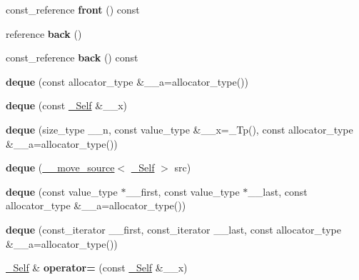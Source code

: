 \begin{DoxyCompactItemize}
const\+\_\+reference {\bfseries front} () const
\item 
\mbox{\label{classdeque_a737db581f2ebbe096db0dddf7b8626db}} 
reference {\bfseries back} ()
\item 
\mbox{\label{classdeque_a0306fdef6e078601dd982b4c22f5fd9f}} 
const\+\_\+reference {\bfseries back} () const
\item 
\mbox{\label{classdeque_a5bbdb37e77ced88dce8da510457b67dd}} 
{\bfseries deque} (const allocator\+\_\+type \&\+\_\+\+\_\+a=allocator\+\_\+type())
\item 
\mbox{\label{classdeque_ae315582b08dbf9ac98a7f7c44d022a2f}} 
{\bfseries deque} (const \hyperlink{classdeque}{\+\_\+\+Self} \&\+\_\+\+\_\+x)
\item 
\mbox{\label{classdeque_ada788fa870ab2ef170a65f7252b4efb0}} 
{\bfseries deque} (size\+\_\+type \+\_\+\+\_\+n, const value\+\_\+type \&\+\_\+\+\_\+x=\+\_\+\+Tp(), const allocator\+\_\+type \&\+\_\+\+\_\+a=allocator\+\_\+type())
\item 
\mbox{\label{classdeque_a8047e4723c11c7098194f7d62353ad13}} 
{\bfseries deque} (\hyperlink{class____move__source}{\+\_\+\+\_\+move\+\_\+source}$<$ \hyperlink{classdeque}{\+\_\+\+Self} $>$ src)
\item 
\mbox{\label{classdeque_ad02ccbea3f5ab0d9b2c30c33f83c8c50}} 
{\bfseries deque} (const value\+\_\+type $\ast$\+\_\+\+\_\+first, const value\+\_\+type $\ast$\+\_\+\+\_\+last, const allocator\+\_\+type \&\+\_\+\+\_\+a=allocator\+\_\+type())
\item 
\mbox{\label{classdeque_a39fddb3c21bd676926040d9496fda161}} 
{\bfseries deque} (const\+\_\+iterator \+\_\+\+\_\+first, const\+\_\+iterator \+\_\+\+\_\+last, const allocator\+\_\+type \&\+\_\+\+\_\+a=allocator\+\_\+type())
\item 
\mbox{\label{classdeque_a356d6145750aa80835244c8683878619}} 
\hyperlink{classdeque}{\+\_\+\+Self} \& {\bfseries operator=} (const \hyperlink{classdeque}{\+\_\+\+Self} \&\+\_\+\+\_\+x)
\item 
\mbox{\label{classdeque_a4629b471ae5aba7a88d2398fb78b87fa}} 

\end{DoxyCompactItemize}
